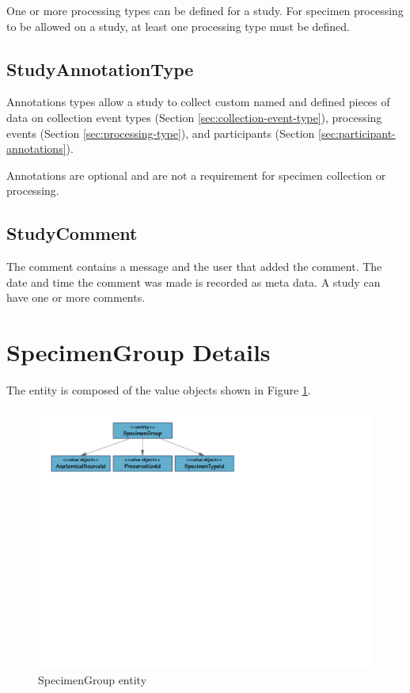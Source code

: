 One or more processing types can be defined for a study. For specimen
processing to be allowed on a study, at least one processing type must be
defined.

\subsection*{StudyAnnotationType}

Annotations types allow a study to collect custom named and defined pieces of
data on collection event types (Section \ref{sec:collection-event-type}),
processing events (Section \ref{sec:processing-type}), and participants
(Section \ref{sec:participant-annotations}).

Annotations are optional and are not a requirement for specimen collection or
processing.

\subsection*{StudyComment}

The comment contains a message and the user that added the comment. The date
and time the comment was made is recorded as meta data. A study can have one or
more comments.

\section{SpecimenGroup Details}
\label{sec:specimen-group}

The  entity is composed of the value objects shown
in Figure \ref{fig:specimen-group}.

\begin{figure}[h]
  \centering
  \includegraphics[trim={9mm 162mm 80mm 9mm}, clip,
    width=1\textwidth]{images/specimen-group}
  \caption{SpecimenGroup entity}
  \label{fig:specimen-group}
\end{figure}

